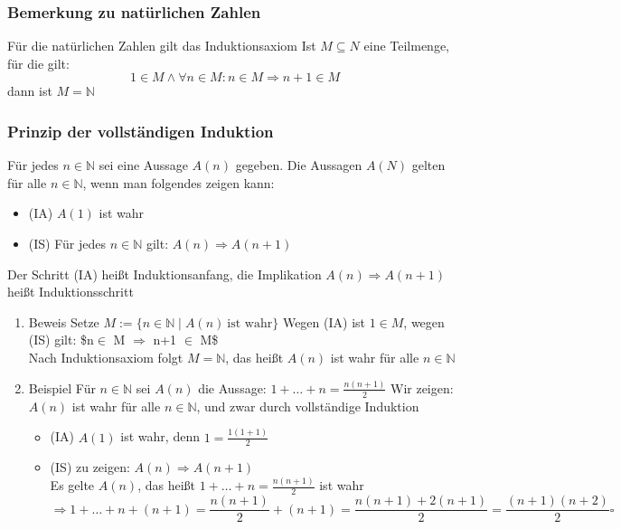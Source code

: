 \documentclass[11pt]{article}
\DeclareMathOperator{\Forall}{\forall}
\begin{document}
\subsubsection{Bemerkung zu natürlichen Zahlen}
\label{sec-2-4-14}
Für die natürlichen Zahlen gilt das Induktionsaxiom
Ist $M\subseteq N$ eine Teilmenge, für die gilt:
\[1\in M \wedge \Forall n\in M : n\in M \Rightarrow n+1 \in M\]
dann ist $M = \mathbb{N}$
\subsubsection{Prinzip der vollständigen Induktion}
\label{sec-2-4-15}
Für jedes $n\in \mathbb{N}$ sei eine Aussage $A(n)$ gegeben. Die Aussagen $A(N)$ gelten für alle $n\in\mathbb{N}$, wenn man folgendes zeigen kann: \\
\begin{itemize}
\item (IA) $A(1)$ ist wahr
\item (IS) Für jedes $n\in\mathbb{N}$ gilt: $A(n) \Rightarrow A(n+1)$
\end{itemize}
Der Schritt (IA) heißt Induktionsanfang, die Implikation $A(n) \Rightarrow A(n+1)$ heißt Induktionsschritt
\begin{enumerate}
\item Beweis
\label{sec-2-4-15-1}
Setze $M := \{n\in \mathbb{N}\mid A(n)~\text{ist wahr}\}$
Wegen (IA) ist $1\in M$, wegen (IS) gilt: \$n$\in$ M $\Rightarrow$ n+1 $\in$ M\$\\
     Nach Induktionsaxiom folgt $M = \mathbb{N}$, das heißt $A(n)$ ist wahr für alle $n\in \mathbb{N}$
\item Beispiel
\label{sec-2-4-15-2}
Für $n\in\mathbb{N}$ sei $A(n)$ die Aussage: $1+\ldots + n = \frac{n(n+1)}{2}$
Wir zeigen: $A(n)$ ist wahr für alle $n\in \mathbb{N}$, und zwar durch vollständige Induktion
\begin{itemize}
\item (IA) $A(1)$ ist wahr, denn $1 = \frac{1(1+1)}{2}$
\item (IS) zu zeigen: $A(n) \Rightarrow A(n+1)$ \\
       Es gelte $A(n)$, das heißt $1+\ldots+n = \frac{n(n+1)}{2}$ ist wahr \[\Rightarrow 1 + \ldots + n + (n + 1) = \frac{n(n+1)}{2} + (n+1) =  \frac{n(n+1) + 2(n+1)}{2} = \frac{(n+1)(n+2)}{2} \square\]
\end{itemize}
\end{enumerate}
\end{document}
